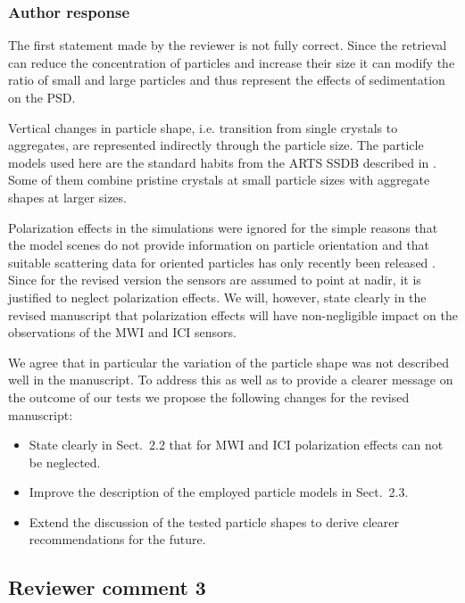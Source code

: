 \documentclass[11pt]{scrartcl}
\begin{document}
\subsubsection*{Author response}

The first statement made by the reviewer is not fully correct. Since the retrieval
can reduce the concentration of particles and increase their size it can modify
the ratio of small and large particles and thus represent the effects of sedimentation
on the PSD.

Vertical changes in particle shape, i.e. transition from single crystals to
aggregates, are represented indirectly through the particle size. The particle
models used here are the standard habits from the ARTS SSDB described in
\cite{eriksson18}. Some of them combine pristine crystals at small particle
sizes with aggregate shapes at larger sizes.

Polarization effects in the simulations were ignored for the simple reasons that
the model scenes do not provide information on particle orientation and that
suitable scattering data for oriented particles has only recently been released
\citep{brath19}. Since for the revised version the sensors are assumed to point
at nadir, it is justified to neglect polarization effects. We will, however,
state clearly in the revised manuscript that polarization effects will have
non-negligible impact on the observations of the MWI and ICI sensors.

We agree that in particular the variation of the particle shape was not
described well in the manuscript. To address this as well as to provide a
clearer message on the outcome of our tests we propose the following changes for
the revised manuscript:

\begin{itemize}
\item State clearly in Sect.~2.2 that for MWI and ICI polarization effects can
  not be neglected.
\item Improve the description of the employed particle models in Sect.~2.3.
\item Extend the discussion of the tested particle shapes to derive clearer
  recommendations for the future.
\end{itemize}

\subsection*{Reviewer comment 3}
\end{document}
